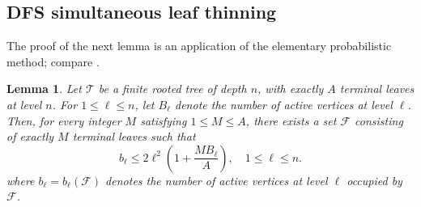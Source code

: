 \documentclass[10pt,a4paper]{amsart}
\newtheorem{lemma}[theorem]{Lemma}
\numberwithin{equation}{section}
\begin{document}
	\subsection{DFS simultaneous leaf thinning}
	\label{sec:tree}
	
	The proof of the next lemma is an application of the elementary probabilistic
	method; compare \cite{AlonSpencer2016}.
	
	\begin{lemma}\label{lem:tree}
		Let $\mathcal T$ be a finite rooted tree of depth $n$, with exactly $A$
		terminal leaves at level $n$. For $1\leq\ell\leq n$, let $B_\ell$ denote
		the number of active vertices at level $\ell$. Then, for every integer $M$
		satisfying $1\leq M\leq A$, there exists a set $\mathcal F$ consisting of
		exactly $M$ terminal leaves such that
		\begin{equation}
			b_\ell
			\leq
			2\ell^2\left(1+\frac{MB_\ell}{A}\right),
			\quad 1\leq\ell\leq n.
			\label{eq:tree-bound}
		\end{equation}
		where $b_\ell=b_\ell(\mathcal F)$ denotes the number of active vertices at
		level $\ell$ occupied by $\mathcal F$.
	\end{lemma}
	
\end{document}
